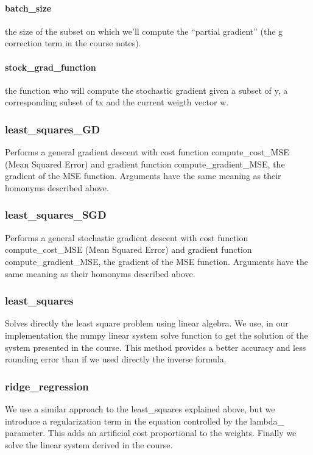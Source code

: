 \documentclass[10pt,conference,compsocconf]{IEEEtran}
\begin{document}
\paragraph{batch\_size} the size of the subset on which we'll compute the ``partial gradient'' (the g correction term in the course notes).
\paragraph{stock\_grad\_function} the function who will compute the stochastic gradient given a subset of y, a corresponding subset of tx and the current weigth vector w.

\subsubsection{least\_squares\_GD}
Performs a general gradient descent with cost function compute\_cost\_MSE (Mean Squared Error) and gradient function compute_gradient_MSE, the gradient of the MSE function. Arguments have the same meaning as their homonyms described above.

\subsubsection{least\_squares\_SGD}
Performs a general stochastic gradient descent with cost function compute\_cost\_MSE (Mean Squared Error) and gradient function compute_gradient_MSE, the gradient of the MSE function. Arguments have the same meaning as their homonyms described above.

\subsubsection{least\_squares}
Solves directly the least square problem using linear algebra. We use, in our implementation the numpy linear system solve function to get the solution of the system presented in the course. This method provides a better accuracy and less rounding error than if we used directly the inverse formula.

\subsubsection{ridge\_regression}
We use a similar approach to the least\_squares explained above, but we introduce a regularization term in the equation controlled by the lambda\_ parameter. This adds an artificial cost proportional to the weights. Finally we solve the linear system derived in the course.
\end{document}
